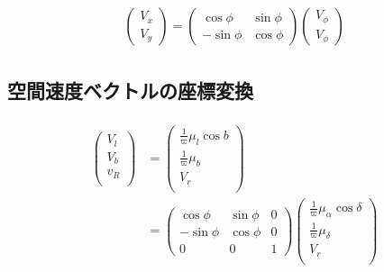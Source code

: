 \begin{align}
\begin{aligned}
	\left(
	\begin{array}{c}
	 	V_x \\
	 	V_y
	\end{array}
	\right)
	=
	\left(
	\begin{array}{cc}
	 	\cos{\phi} & \sin{\phi}\\
	 	-\sin{\phi} & \cos{\phi}
	\end{array}
	\right)
	\left(
	\begin{array}{cc}
	 	V_{\phi} \\
	 	V_{\phi}
	\end{array}
	\right)
\end{aligned}
\end{align}





\subsection{空間速度ベクトルの座標変換}
\begin{align}
\begin{aligned}
    \left(
	\begin{array}{c}
	 	V_l\\
		V_b\\
		v_R\\
	\end{array}
	\right)
	&=
	\left(
	\begin{array}{c}
	 	\frac{1}{\varpi}\mu_{l}\cos b\\
		\frac{1}{\varpi}\mu_{b}\\
		V_{r}\\
	\end{array}
	\right) \\
	&=
	\left(
	\begin{array}{ccc}
	 	\cos \phi & \sin \phi & 0\\
		-\sin \phi & \cos \phi & 0\\
		0 & 0 & 1
	\end{array}
	\right)
	\left(
	\begin{array}{c}
	 	\frac{1}{\varpi}\mu_{\alpha}\cos \delta\\
		\frac{1}{\varpi}\mu_{\delta}\\
		V_{r}\\
	\end{array}
	\right)
\end{aligned}
\end{align}

